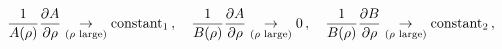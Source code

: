 \begin{equation}
\frac{1}{A(\rho)} \frac{\partial A}{\partial \rho} \underset{(\rho
\,\, {\rm large})}{\rightarrow} {\rm constant}_1\,,\quad
\frac{1}{B(\rho)} \frac{\partial A}{\partial \rho} \underset{(\rho
\,\, {\rm large})}{\rightarrow} 0\,,\quad \frac{1}{B(\rho)}
\frac{\partial B}{\partial \rho} \underset{(\rho \,\, {\rm
large})}{\rightarrow} {\rm constant}_2\,,
\end{equation}

